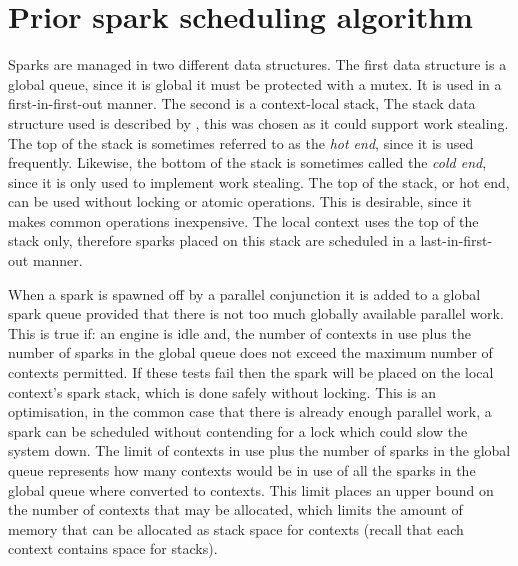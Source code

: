 \section{Prior spark scheduling algorithm}
\label{sec:old_scheduling}


Sparks are managed in two different data structures.
The first data structure is a global queue,
since it is global it must be protected with a mutex.
It is used in a first-in-first-out manner.
The second is a context-local stack,
The stack data structure used is described by \citet{workstealing_queue},
this was chosen as it could support work stealing.
The top of the stack is sometimes referred to as the \emph{hot end},
since it is used frequently.
Likewise, the bottom of the stack is sometimes called the
\emph{cold end}, since it is only used to implement work stealing.
The top of the stack, or hot end, can be used without locking or atomic
operations.
This is desirable, since it makes common operations inexpensive.
The local context uses the top of the stack only,
therefore sparks placed on this stack are scheduled in a
last-in-first-out manner.

When a spark is spawned off by a parallel conjunction
it is added to a global spark queue provided that there is not too much
globally available parallel work.
This is true if:
an engine is idle and,
the number of contexts in use plus the number of sparks in the global queue
does not exceed the maximum number of contexts permitted.
If these tests fail then the spark will be placed on the local context's
spark stack,
which is done safely without locking.
This is an optimisation,
in the common case that there is already enough parallel work,
a spark can be scheduled without contending for a lock which could slow the
system down.
The limit of contexts in use plus the number of sparks in the global queue
represents how many contexts would be in use of all the sparks in the global
queue where converted to contexts.
This limit places an upper bound on the number of contexts that may be
allocated,
which limits the amount of memory that can be allocated as stack space for
contexts
(recall that each context contains space for stacks).

